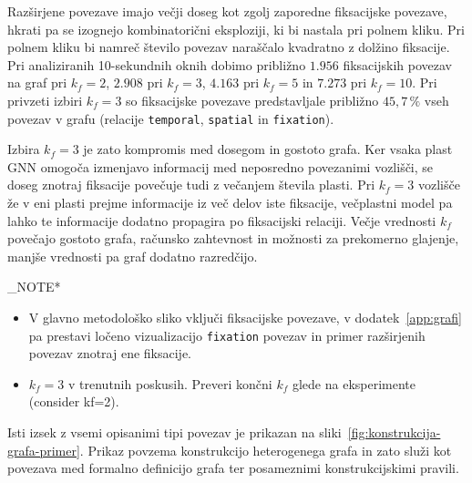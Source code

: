 
Razširjene povezave imajo večji doseg kot zgolj zaporedne fiksacijske povezave, hkrati pa se izognejo kombinatorični eksploziji, ki bi nastala pri polnem kliku.
Pri polnem kliku bi namreč število povezav naraščalo kvadratno z dolžino fiksacije.
Pri analiziranih 10-sekundnih oknih dobimo približno $1.956$ fiksacijskih povezav na graf pri $k_f=2$, $2.908$ pri $k_f=3$, $4.163$ pri $k_f=5$ in $7.273$ pri $k_f=10$.
Pri privzeti izbiri $k_f=3$ so fiksacijske povezave predstavljale približno $45{,}7\,\%$ vseh povezav v grafu (relacije \texttt{temporal}, \texttt{spatial} in \texttt{fixation}).

Izbira $k_f=3$ je zato kompromis med dosegom in gostoto grafa.
Ker vsaka plast GNN omogoča izmenjavo informacij med neposredno povezanimi vozlišči, se doseg znotraj fiksacije povečuje tudi z večanjem števila plasti.
Pri $k_f=3$ vozlišče že v eni plasti prejme informacije iz več delov iste fiksacije, večplastni model pa lahko te informacije dodatno propagira po fiksacijski relaciji.
Večje vrednosti $k_f$ povečajo gostoto grafa, računsko zahtevnost in možnosti za prekomerno glajenje, manjše vrednosti pa graf dodatno razredčijo.

\END_NOTE*{
    \begin{itemize}
        \item V glavno metodološko sliko vključi fiksacijske povezave, v dodatek~\ref{app:grafi} pa prestavi ločeno vizualizacijo \texttt{fixation} povezav in primer razširjenih povezav znotraj ene fiksacije.
        \item $k_f=3$ v trenutnih poskusih. Preveri končni $k_f$ glede na eksperimente (consider kf=2).
    \end{itemize}
}

Isti izsek z vsemi opisanimi tipi povezav je prikazan na sliki~\ref{fig:konstrukcija-grafa-primer}.
Prikaz povzema konstrukcijo heterogenega grafa in zato služi kot povezava med formalno definicijo grafa ter posameznimi konstrukcijskimi pravili.

